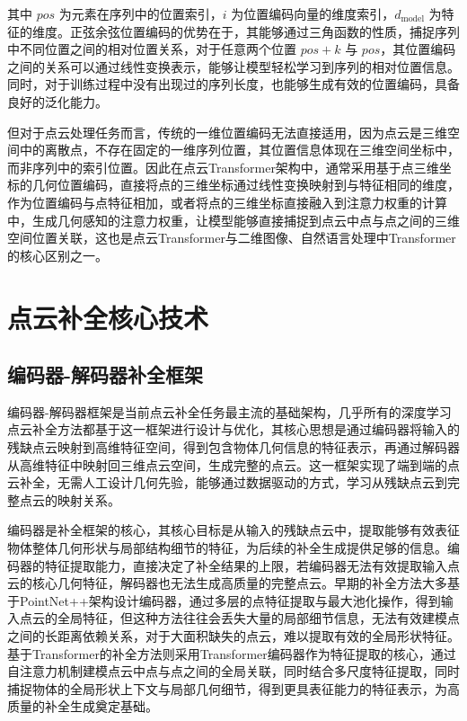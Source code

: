 其中 $pos$ 为元素在序列中的位置索引，$i$ 为位置编码向量的维度索引，$d_{\text{model}}$ 为特征的维度。正弦余弦位置编码的优势在于，其能够通过三角函数的性质，捕捉序列中不同位置之间的相对位置关系，对于任意两个位置 $pos+k$ 与 $pos$，其位置编码之间的关系可以通过线性变换表示，能够让模型轻松学习到序列的相对位置信息。同时，对于训练过程中没有出现过的序列长度，也能够生成有效的位置编码，具备良好的泛化能力。

但对于点云处理任务而言，传统的一维位置编码无法直接适用，因为点云是三维空间中的离散点，不存在固定的一维序列位置，其位置信息体现在三维空间坐标中，而非序列中的索引位置。因此在点云Transformer架构中，通常采用基于点三维坐标的几何位置编码，直接将点的三维坐标通过线性变换映射到与特征相同的维度，作为位置编码与点特征相加，或者将点的三维坐标直接融入到注意力权重的计算中，生成几何感知的注意力权重，让模型能够直接捕捉到点云中点与点之间的三维空间位置关联，这也是点云Transformer与二维图像、自然语言处理中Transformer的核心区别之一\cite{yu2021pointr}。

\section{点云补全核心技术}

\subsection{编码器-解码器补全框架}
编码器-解码器框架是当前点云补全任务最主流的基础架构，几乎所有的深度学习点云补全方法都基于这一框架进行设计与优化，其核心思想是通过编码器将输入的残缺点云映射到高维特征空间，得到包含物体几何信息的特征表示，再通过解码器从高维特征中映射回三维点云空间，生成完整的点云。这一框架实现了端到端的点云补全，无需人工设计几何先验，能够通过数据驱动的方式，学习从残缺点云到完整点云的映射关系。

编码器是补全框架的核心，其核心目标是从输入的残缺点云中，提取能够有效表征物体整体几何形状与局部结构细节的特征，为后续的补全生成提供足够的信息。编码器的特征提取能力，直接决定了补全结果的上限，若编码器无法有效提取输入点云的核心几何特征，解码器也无法生成高质量的完整点云。早期的补全方法大多基于PointNet++架构设计编码器，通过多层的点特征提取与最大池化操作，得到输入点云的全局特征，但这种方法往往会丢失大量的局部细节信息，无法有效建模点之间的长距离依赖关系，对于大面积缺失的点云，难以提取有效的全局形状特征。基于Transformer的补全方法则采用Transformer编码器作为特征提取的核心，通过自注意力机制建模点云中点与点之间的全局关联，同时结合多尺度特征提取，同时捕捉物体的全局形状上下文与局部几何细节，得到更具表征能力的特征表示，为高质量的补全生成奠定基础\cite{yu2023adapointr}。

